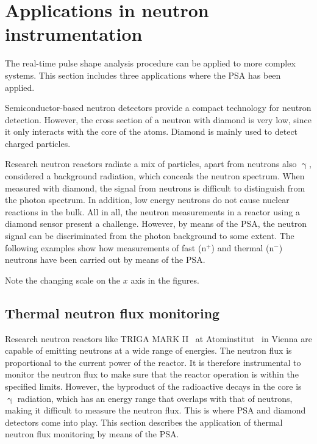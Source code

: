 \section{Applications in neutron instrumentation}
\label{sec:nm}

The real-time pulse shape analysis procedure can be applied to more complex systems. This section includes three applications where the PSA has been applied.

Semiconductor-based neutron detectors provide a compact technology for neutron detection. However, the cross section of a neutron with diamond is very low, since it only interacts with the core of the atoms. Diamond is mainly used to detect charged particles. 

Research neutron reactors radiate a mix of particles, apart from neutrons also $\upgamma$, considered a background radiation, which conceals the neutron spectrum. When measured with diamond, the signal from neutrons is difficult to distinguish from the photon spectrum. In addition, low energy neutrons do not cause nuclear reactions in the bulk. All in all, the neutron measurements in a reactor using a diamond sensor present a challenge. However, by means of the PSA, the neutron signal can be discriminated from the photon background to some extent. The following examples show how measurements of fast (n$^+$) and thermal (n$^-$) neutrons have been carried out by means of the PSA.

Note the changing scale on the $x$ axis in the figures.


\subsection{Thermal neutron flux monitoring}
Research neutron reactors like TRIGA MARK II~\cite{Triga:00000} at Atominstitut~\cite{AtomInst:00000} in Vienna are capable of emitting neutrons at a wide range of energies. The neutron flux is proportional to the current power of the reactor. It is therefore instrumental to monitor the neutron flux to make sure that the reactor operation is within the specified limits. However, the byproduct of the radioactive decays in the core is $\upgamma$ radiation, which has an energy range that overlaps with that of neutrons, making it difficult to measure the neutron flux. This is where PSA and diamond detectors come into play. This section describes the application of thermal neutron flux monitoring by means of the PSA.

